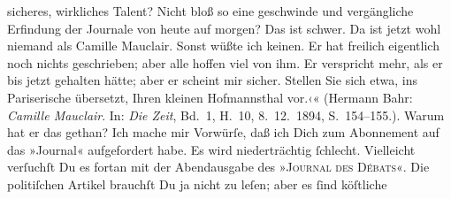 \begin{ledgroupsized}[t]{13cm}
{{{                     sicheres, wirkliches Talent? Nicht bloß so eine geschwinde und vergängliche
                     Erfindung der Journale von heute auf morgen? Das ist schwer. Da ist jetzt wohl
                     niemand als Camille Mauclair. Sonst wüßte
                     ich keinen. Er hat freilich eigentlich noch nichts geschrieben; aber alle
                     hoffen viel von ihm. Er verspricht mehr, als er bis jetzt gehalten hätte; aber
                     er scheint mir sicher. Stellen Sie sich etwa, ins Pariserische übersetzt, Ihren kleinen Hofmannsthal vor.‹« (Hermann Bahr: \emph{Camille Mauclair}. In: \emph{Die Zeit}, Bd. 1, H. 10, 8. 12. 1894,
                  S. 154–155.)}}}\label{K_L02630-7h}. Warum hat er das gethan?\pend
           \pstart
           Ich mache mir Vorwürſe, daß ich Dich zum Abonnement auf das {\pb}»Journal« aufgefordert habe. Es wird niederträchtig ſchlecht. Vielleicht
               verſuchſt Du es fortan mit der Abendausgabe des »\textsc{Journal des Débats}«. Die politiſchen Artikel brauchſt Du ja nicht zu leſen; aber es ſind köſtliche

\end{ledgroupsized}
